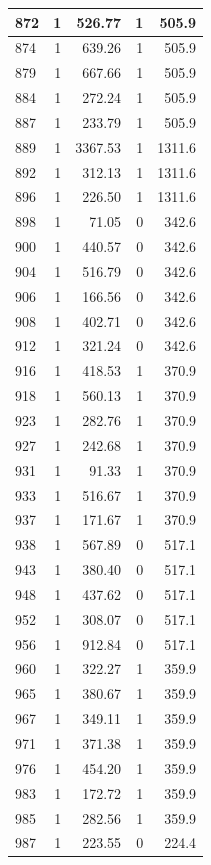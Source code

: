 \documentclass[
  spanish,
  12pt,
]{book}
\begin{document}
\begin{tabular}{l|r|r|r|r}
\hline
872 & 1 & 526.77 & 1 & 505.9\\
\hline
874 & 1 & 639.26 & 1 & 505.9\\
\hline
879 & 1 & 667.66 & 1 & 505.9\\
\hline
884 & 1 & 272.24 & 1 & 505.9\\
\hline
887 & 1 & 233.79 & 1 & 505.9\\
\hline
889 & 1 & 3367.53 & 1 & 1311.6\\
\hline
892 & 1 & 312.13 & 1 & 1311.6\\
\hline
896 & 1 & 226.50 & 1 & 1311.6\\
\hline
898 & 1 & 71.05 & 0 & 342.6\\
\hline
900 & 1 & 440.57 & 0 & 342.6\\
\hline
904 & 1 & 516.79 & 0 & 342.6\\
\hline
906 & 1 & 166.56 & 0 & 342.6\\
\hline
908 & 1 & 402.71 & 0 & 342.6\\
\hline
912 & 1 & 321.24 & 0 & 342.6\\
\hline
916 & 1 & 418.53 & 1 & 370.9\\
\hline
918 & 1 & 560.13 & 1 & 370.9\\
\hline
923 & 1 & 282.76 & 1 & 370.9\\
\hline
927 & 1 & 242.68 & 1 & 370.9\\
\hline
931 & 1 & 91.33 & 1 & 370.9\\
\hline
933 & 1 & 516.67 & 1 & 370.9\\
\hline
937 & 1 & 171.67 & 1 & 370.9\\
\hline
938 & 1 & 567.89 & 0 & 517.1\\
\hline
943 & 1 & 380.40 & 0 & 517.1\\
\hline
948 & 1 & 437.62 & 0 & 517.1\\
\hline
952 & 1 & 308.07 & 0 & 517.1\\
\hline
956 & 1 & 912.84 & 0 & 517.1\\
\hline
960 & 1 & 322.27 & 1 & 359.9\\
\hline
965 & 1 & 380.67 & 1 & 359.9\\
\hline
967 & 1 & 349.11 & 1 & 359.9\\
\hline
971 & 1 & 371.38 & 1 & 359.9\\
\hline
976 & 1 & 454.20 & 1 & 359.9\\
\hline
983 & 1 & 172.72 & 1 & 359.9\\
\hline
985 & 1 & 282.56 & 1 & 359.9\\
\hline
987 & 1 & 223.55 & 0 & 224.4\\

\end{tabular}
\end{document}
